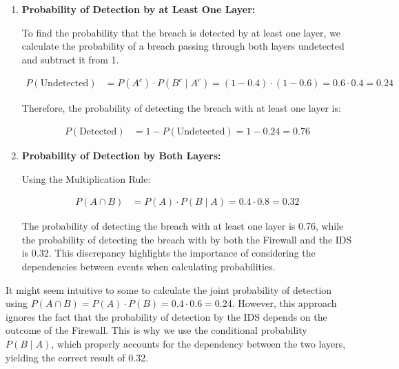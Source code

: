 \begin{solution}
\begin{enumerate}[label=(\alph*)]
    \item \textbf{Probability of Detection by at Least One Layer:}

    To find the probability that the breach is detected by at least one layer, we calculate the probability of a breach passing through both layers undetected and subtract it from 1.

    \begin{align*}
        P(\text{Undetected}) &= P(A^c) \cdot P(B^c \mid A^c) 
        = (1 - 0.4) \cdot (1 - 0.6) 
        = 0.6 \cdot 0.4
        = 0.24
    \end{align*}

    Therefore, the probability of detecting the breach with at least one layer is:

    \begin{align*}
    P(\text{Detected}) &= 1 - P(\text{Undetected}) = 1 - 0.24 = 0.76
    \end{align*}

    \item \textbf{Probability of Detection by Both Layers:}

    Using the Multiplication Rule:

    \begin{align*}
    P(A \cap B) &= P(A) \cdot P(B \mid A) = 0.4 \cdot 0.8 = 0.32
    \end{align*}

    The probability of detecting the breach with at least one layer is 0.76, while the probability of detecting the breach with by both the Firewall and the IDS is 0.32. This discrepancy highlights the importance of considering the dependencies between events when calculating probabilities.
\end{enumerate}
\end{solution}

\begin{remark}
    It might seem intuitive to some to calculate the joint probability of detection using $P(A \cap B)=P(A) \cdot P(B)=0.4 \cdot 0.6=0.24$. However, this approach ignores the fact that the probability of detection by the IDS depends on the outcome of the Firewall. This is why we use the conditional probability $P(B \mid A)$, which properly accounts for the dependency between the two layers, yielding the correct result of 0.32.
\end{remark}

